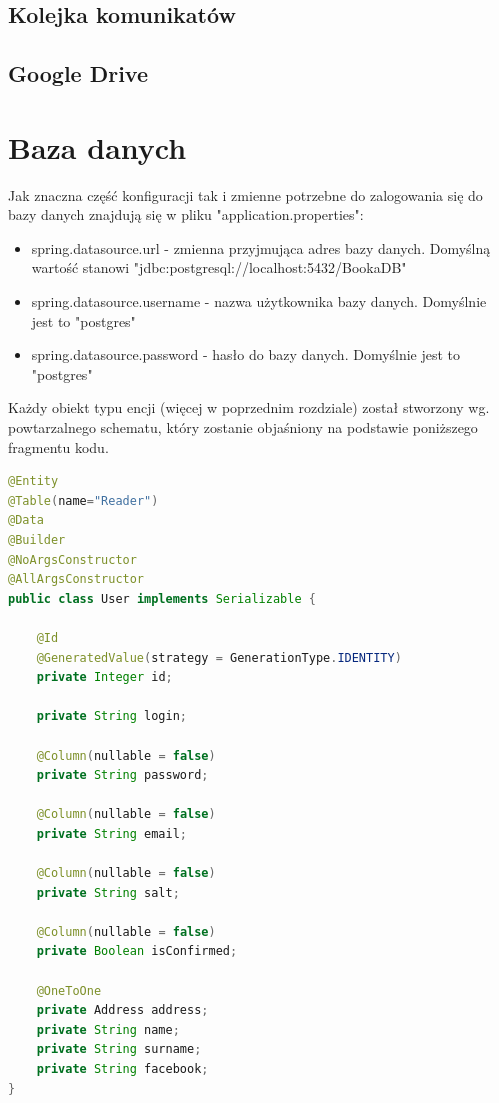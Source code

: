 \documentclass{report}
\begin{document}
	
		\subsection{Kolejka komunikatów}
		
		\subsection{Google Drive}
	
	\section{Baza danych}
	
		Jak znaczna część konfiguracji tak i zmienne potrzebne do zalogowania się do bazy danych znajdują się w pliku "application.properties":

		\begin{itemize}
			\item spring.datasource.url - zmienna przyjmująca adres bazy danych. Domyślną wartość stanowi "jdbc:postgresql://localhost:5432/BookaDB"
			\item spring.datasource.username - nazwa użytkownika bazy danych. Domyślnie jest to "postgres"
			\item spring.datasource.password - hasło do bazy danych. Domyślnie jest to "postgres"
		\end{itemize}

		Każdy obiekt typu encji (więcej w poprzednim rozdziale) został stworzony wg. powtarzalnego schematu, który zostanie objaśniony na podstawie poniższego fragmentu kodu.

		\begin{lstlisting}[language=Java, breaklines]
@Entity
@Table(name="Reader")
@Data
@Builder
@NoArgsConstructor
@AllArgsConstructor
public class User implements Serializable {

    @Id
    @GeneratedValue(strategy = GenerationType.IDENTITY)
    private Integer id;

    private String login;

    @Column(nullable = false)
    private String password;

    @Column(nullable = false)
    private String email;

    @Column(nullable = false)
    private String salt;

    @Column(nullable = false)
    private Boolean isConfirmed;

    @OneToOne
    private Address address;
    private String name;
    private String surname;
    private String facebook;
}
		\end{lstlisting}
\end{document}

